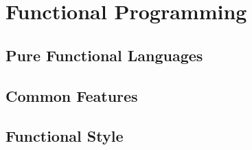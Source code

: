 \section{Functional Programming}

\subsection{Pure Functional Languages}

\subsection{Common Features}

\begin{itemize}
\end{itemize}

\subsection{Functional Style}


